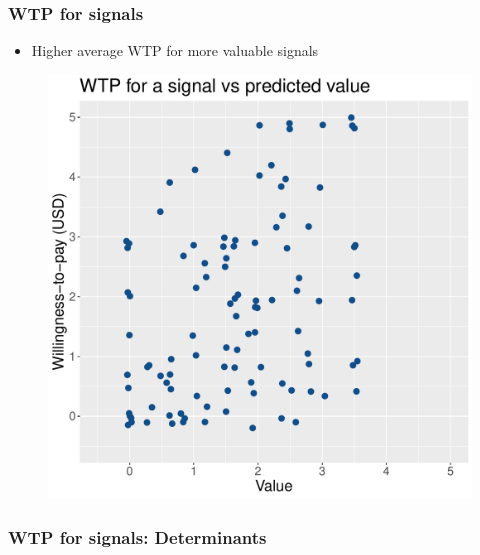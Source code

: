 \documentclass[11pt,hyperref={bookmarks=false}]{beamer}
\begin{document}
\begin{frame}
\frametitle{WTP for signals}
\begin{itemize}
\item Higher average WTP for more valuable signals
\end{itemize}
\begin{figure}[h]
\includegraphics[scale=0.55]{Graphs/WTP_curve2.pdf}
\end{figure}
\end{frame}


\begin{frame}
\frametitle{WTP for signals: Determinants}
\footnotesize


\end{frame}
\end{document}
